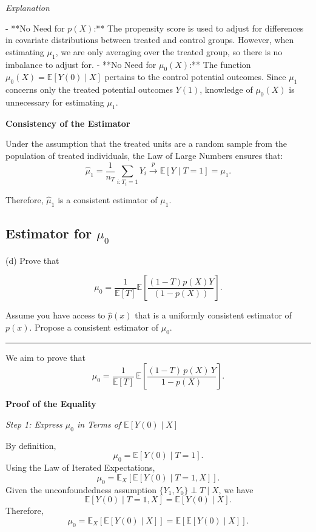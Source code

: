 \documentclass{article}
\newenvironment{colorparagraph}[1]{\par\color{#1}}{\par}
\begin{document}
\textit{Explanation}

- **No Need for \(p(X)\):** The propensity score is used to adjust for differences in covariate distributions between treated and control groups. However, when estimating \(\mu_1\), we are only averaging over the treated group, so there is no imbalance to adjust for.
- **No Need for \(\mu_0(X)\):** The function \(\mu_0(X) = \mathbb{E}[Y(0) \mid X]\) pertains to the control potential outcomes. Since \(\mu_1\) concerns only the treated potential outcomes \(Y(1)\), knowledge of \(\mu_0(X)\) is unnecessary for estimating \(\mu_1\).

\textbf{Consistency of the Estimator}

Under the assumption that the treated units are a random sample from the population of treated individuals, the Law of Large Numbers ensures that:
\[
\hat{\mu}_1 = \frac{1}{n_T} \sum_{i: T_i = 1} Y_i \xrightarrow{p} \mathbb{E}[Y \mid T = 1] = \mu_1.
\]

Therefore, \(\hat{\mu}_1\) is a consistent estimator of \(\mu_1\).

\begin{colorparagraph}{questioncolor}
\label{q2d}\subsection{Estimator for \( \mu_0 \)}
(d) Prove that 

\[
\mu_0 = \frac{1}{\mathbb{E}[T]} \mathbb{E} \left[ \frac{(1 - T)p(X)Y}{(1 - p(X))} \right].
\]

Assume you have access to \( \hat{p}(x) \) that is a uniformly consistent estimator of \( p(x) \). Propose a consistent estimator of \( \mu_0 \).

\rule{\textwidth}{0.5pt}
\end{colorparagraph}

We aim to prove that
\[
\mu_0 = \frac{1}{\mathbb{E}[T]} \, \mathbb{E}\left[ \frac{(1 - T) \, p(X) \, Y}{1 - p(X)} \right].
\]

\textbf{Proof of the Equality}

\textit{Step 1: Express \(\mu_0\) in Terms of \(\mathbb{E}[Y(0) \mid X]\)}

By definition,
\[
\mu_0 = \mathbb{E}[Y(0) \mid T = 1].
\]
Using the Law of Iterated Expectations,
\[
\mu_0 = \mathbb{E}_X\left[ \mathbb{E}[Y(0) \mid T = 1, X] \right].
\]
Given the unconfoundedness assumption \(\{Y_1, Y_0\} \perp T \mid X\), we have
\[
\mathbb{E}[Y(0) \mid T = 1, X] = \mathbb{E}[Y(0) \mid X].
\]
Therefore,
\[
\mu_0 = \mathbb{E}_X\left[ \mathbb{E}[Y(0) \mid X] \right] = \mathbb{E}[ \mathbb{E}[Y(0) \mid X] ].
\]
\end{document}
